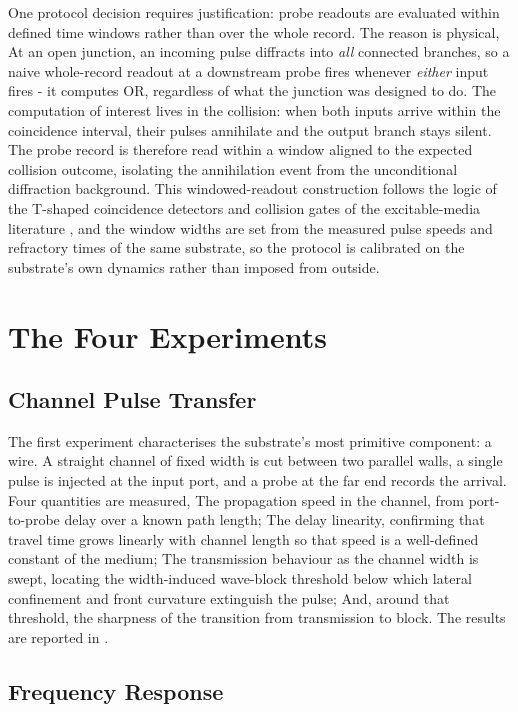 One protocol decision requires justification: probe readouts are evaluated within defined time windows rather than over the whole record. 
The reason is physical, At an open junction, an incoming pulse diffracts into \emph{all} connected branches, so a naive whole-record readout at a downstream probe fires whenever \emph{either} input fires - it computes OR, regardless of what the junction was designed to do. 
The computation of interest lives in the collision: when both inputs arrive within the coincidence interval, their pulses annihilate and the output branch stays silent. 
The probe record is therefore read within a window aligned to the expected collision outcome, isolating the annihilation event from the unconditional diffraction background. 
This windowed-readout construction follows the logic of the T-shaped coincidence detectors and collision gates of the excitable-media literature \cite{gorecka2003tshaped, toth1995logic}, and the window widths are set from the measured pulse speeds and refractory times of the same substrate, so the protocol is calibrated on the substrate's own dynamics rather than imposed from outside.

\section{The Four Experiments}
\label{sec:meth_experiments}

\subsection{Channel Pulse Transfer}
\label{sec:meth_exp_channel}


The first experiment characterises the substrate's most primitive component: a wire. 
A straight channel of fixed width is cut between two parallel walls, a single pulse is injected at the input port, and a probe at the far end records the arrival. 
Four quantities are measured, The propagation speed in the channel, from port-to-probe delay over a known path length; 
The delay linearity, confirming that travel time grows linearly with channel length so that speed is a well-defined constant of the medium; 
The transmission behaviour as the channel width is swept, locating the width-induced wave-block threshold below which lateral confinement and front curvature extinguish the pulse; 
And, around that threshold, the sharpness of the transition from transmission to block. 
The results are reported in .

\subsection{Frequency Response}
\label{sec:meth_exp_frequency}

